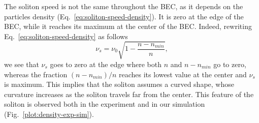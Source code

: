 The soliton speed is not the same throughout the BEC, as it depends on the particles density (Eq.~\eqref{eq:soliton-speed-density}). It is zero at the edge of the BEC, while it reaches its maximum at the center of the BEC. Indeed, rewriting Eq.~\eqref{eq:soliton-speed-density} as follows
\begin{equation}
\nu_s = \nu_0 \sqrt{1 - \frac{n - n_{min}}{n}},
\end{equation}
we see that $\nu_s$ goes to zero at the edge where both $n$ and $n - n_{min}$ go to zero, whereas the fraction $(n - n_{min}) / n$ reaches its lowest value at the center and $\nu_s$ is maximum. This implies that the soliton assumes a curved shape, whose
 curvature increases as the soliton travels far from the center. This feature of the soliton is observed both in the experiment and in our simulation (Fig.~\ref{plot:density-exp-sim}). 

